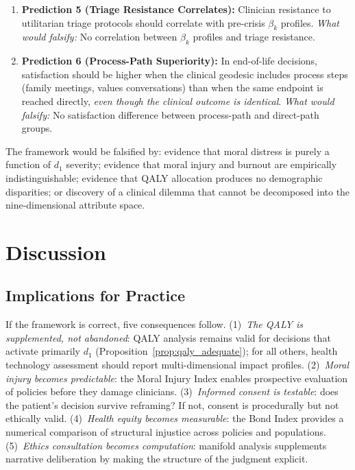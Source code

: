 \documentclass[12pt]{article}
\theoremstyle{definition}
\theoremstyle{remark}
\begin{document}
\begin{enumerate}
    \item \textbf{Prediction 5 (Triage Resistance Correlates):} Clinician resistance to utilitarian triage protocols should correlate with pre-crisis $\beta_k$ profiles.  \emph{What would falsify:} No correlation between $\beta_k$ profiles and triage resistance.

    \item \textbf{Prediction 6 (Process-Path Superiority):} In end-of-life decisions, satisfaction should be higher when the clinical geodesic includes process steps (family meetings, values conversations) than when the same endpoint is reached directly, \emph{even though the clinical outcome is identical}.  \emph{What would falsify:} No satisfaction difference between process-path and direct-path groups.
\end{enumerate}

The framework would be falsified by: evidence that moral distress is purely a function of $d_1$ severity; evidence that moral injury and burnout are empirically indistinguishable; evidence that QALY allocation produces no demographic disparities; or discovery of a clinical dilemma that cannot be decomposed into the nine-dimensional attribute space.


\section{Discussion}
\label{sec:discussion}

\subsection{Implications for Practice}

If the framework is correct, five consequences follow.  (1)~\emph{The QALY is supplemented, not abandoned}: QALY analysis remains valid for decisions that activate primarily $d_1$ (Proposition~\ref{prop:qaly_adequate}); for all others, health technology assessment should report multi-dimensional impact profiles.  (2)~\emph{Moral injury becomes predictable}: the Moral Injury Index enables prospective evaluation of policies before they damage clinicians.  (3)~\emph{Informed consent is testable}: does the patient's decision survive reframing?  If not, consent is procedurally but not ethically valid.  (4)~\emph{Health equity becomes measurable}: the Bond Index provides a numerical comparison of structural injustice across policies and populations.  (5)~\emph{Ethics consultation becomes computation}: manifold analysis supplements narrative deliberation by making the structure of the judgment explicit.
\end{document}

